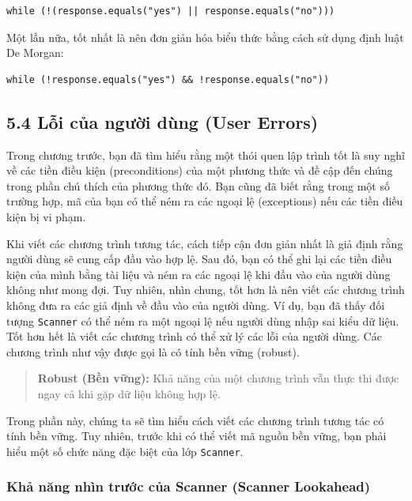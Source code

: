 \begin{verbatim}
while (!(response.equals("yes") || response.equals("no")))
\end{verbatim}

Một lần nữa, tốt nhất là nên đơn giản hóa biểu thức bằng cách sử dụng định luật De Morgan:

\begin{verbatim}
while (!response.equals("yes") && !response.equals("no"))
\end{verbatim}

\subsection*{5.4 Lỗi của người dùng (User Errors)}

Trong chương trước, bạn đã tìm hiểu rằng một thói quen lập trình tốt là suy nghĩ về các tiền điều kiện (preconditions) của một phương thức và đề cập đến chúng trong phần chú thích của phương thức đó. Bạn cũng đã biết rằng trong một số trường hợp, mã của bạn có thể ném ra các ngoại lệ (exceptions) nếu các tiền điều kiện bị vi phạm.

Khi viết các chương trình tương tác, cách tiếp cận đơn giản nhất là giả định rằng người dùng sẽ cung cấp đầu vào hợp lệ. Sau đó, bạn có thể ghi lại các tiền điều kiện của mình bằng tài liệu và ném ra các ngoại lệ khi đầu vào của người dùng không như mong đợi. Tuy nhiên, nhìn chung, tốt hơn là nên viết các chương trình không đưa ra các giả định về đầu vào của người dùng. Ví dụ, bạn đã thấy đối tượng \texttt{Scanner} có thể ném ra một ngoại lệ nếu người dùng nhập sai kiểu dữ liệu. Tốt hơn hết là viết các chương trình có thể xử lý các lỗi của người dùng. Các chương trình như vậy được gọi là có tính bền vững (robust).

\begin{quote}
\textbf{Robust (Bền vững):} Khả năng của một chương trình vẫn thực thi được ngay cả khi gặp dữ liệu không hợp lệ.
\end{quote}

Trong phần này, chúng ta sẽ tìm hiểu cách viết các chương trình tương tác có tính bền vững. Tuy nhiên, trước khi có thể viết mã nguồn bền vững, bạn phải hiểu một số chức năng đặc biệt của lớp \texttt{Scanner}.

\subsubsection*{Khả năng nhìn trước của Scanner (Scanner Lookahead)}

